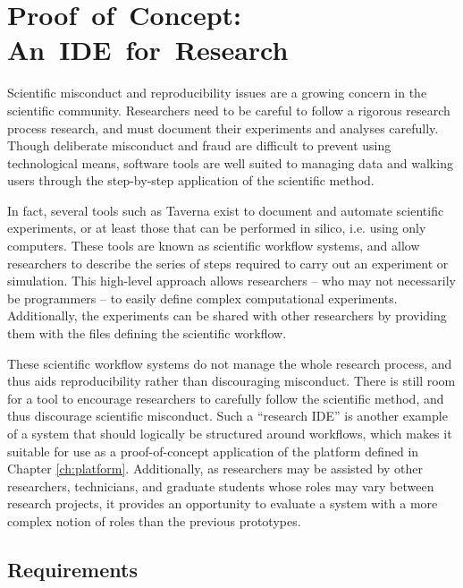 \documentclass[document.tex]{subfiles}
\begin{document}
\chapter{Proof~of~Concept: An~IDE~for~Research}
\label {ch:case-study-2}

Scientific misconduct and reproducibility issues are a growing concern in the scientific community. Researchers need to be careful to follow a rigorous research process research, and must document their experiments and analyses carefully. Though deliberate misconduct and fraud are difficult to prevent using technological means, software tools are well suited to managing data and walking users through the step-by-step application of the scientific method.

In fact, several tools such as Taverna \cite{taverna-website} exist to document and automate scientific experiments, or at least those that can be performed in silico, i.e. using only computers. These tools are known as scientific workflow systems, and allow researchers to describe the series of steps required to carry out an experiment or simulation. This high-level approach allows researchers -- who may not necessarily be programmers -- to easily define complex computational experiments. Additionally, the experiments can be shared with other researchers by providing them with the files defining the scientific workflow.

These scientific workflow systems do not manage the whole research process, and thus aids reproducibility rather than discouraging misconduct. There is still room for a tool to encourage researchers to carefully follow the scientific method, and thus discourage scientific misconduct. Such a ``research IDE'' is another example of a system that should logically be structured around workflows, which makes it suitable for use as a proof-of-concept application of the platform defined in Chapter \ref{ch:platform}. Additionally, as researchers may be assisted by other researchers, technicians, and graduate students whose roles may vary between research projects, it provides an opportunity to evaluate a system with a more complex notion of roles than the previous prototypes.

\section {Requirements}
\label{sec:case-research-requirements}
\end{document}
